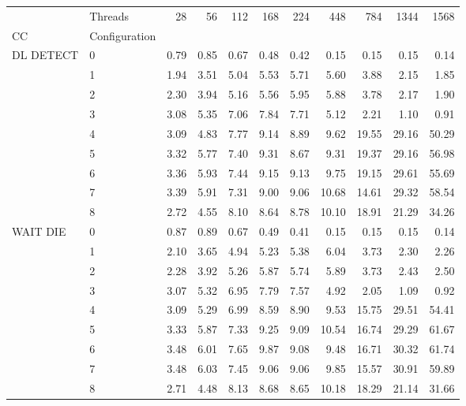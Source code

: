 \begin{tabular}{llrrrrrrrrr}
\toprule
       & Threads &  28   &  56   &  112  &  168  &  224  &  448  &  784  &  1344 &   1568 \\
CC & Configuration &       &       &       &       &       &       &       &       &        \\
\midrule
DL DETECT & 0 &  0.79 &  0.85 &  0.67 &  0.48 &  0.42 &  0.15 &  0.15 &  0.15 &   0.14 \\
       & 1 &  1.94 &  3.51 &  5.04 &  5.53 &  5.71 &  5.60 &  3.88 &  2.15 &   1.85 \\
       & 2 &  2.30 &  3.94 &  5.16 &  5.56 &  5.95 &  5.88 &  3.78 &  2.17 &   1.90 \\
       & 3 &  3.08 &  5.35 &  7.06 &  7.84 &  7.71 &  5.12 &  2.21 &  1.10 &   0.91 \\
       & 4 &  3.09 &  4.83 &  7.77 &  9.14 &  8.89 &  9.62 & 19.55 & 29.16 &  50.29 \\
       & 5 &  3.32 &  5.77 &  7.40 &  9.31 &  8.67 &  9.31 & 19.37 & 29.16 &  56.98 \\
       & 6 &  3.36 &  5.93 &  7.44 &  9.15 &  9.13 &  9.75 & 19.15 & 29.61 &  55.69 \\
       & 7 &  3.39 &  5.91 &  7.31 &  9.00 &  9.06 & 10.68 & 14.61 & 29.32 &  58.54 \\
       & 8 &  2.72 &  4.55 &  8.10 &  8.64 &  8.78 & 10.10 & 18.91 & 21.29 &  34.26 \\
WAIT DIE & 0 &  0.87 &  0.89 &  0.67 &  0.49 &  0.41 &  0.15 &  0.15 &  0.15 &   0.14 \\
       & 1 &  2.10 &  3.65 &  4.94 &  5.23 &  5.38 &  6.04 &  3.73 &  2.30 &   2.26 \\
       & 2 &  2.28 &  3.92 &  5.26 &  5.87 &  5.74 &  5.89 &  3.73 &  2.43 &   2.50 \\
       & 3 &  3.07 &  5.32 &  6.95 &  7.79 &  7.57 &  4.92 &  2.05 &  1.09 &   0.92 \\
       & 4 &  3.09 &  5.29 &  6.99 &  8.59 &  8.90 &  9.53 & 15.75 & 29.51 &  54.41 \\
       & 5 &  3.33 &  5.87 &  7.33 &  9.25 &  9.09 & 10.54 & 16.74 & 29.29 &  61.67 \\
       & 6 &  3.48 &  6.01 &  7.65 &  9.87 &  9.08 &  9.48 & 16.71 & 30.32 &  61.74 \\
       & 7 &  3.48 &  6.03 &  7.45 &  9.06 &  9.06 &  9.85 & 15.57 & 30.91 &  59.89 \\
       & 8 &  2.71 &  4.48 &  8.13 &  8.68 &  8.65 & 10.18 & 18.29 & 21.14 &  31.66 \\

\end{tabular}

